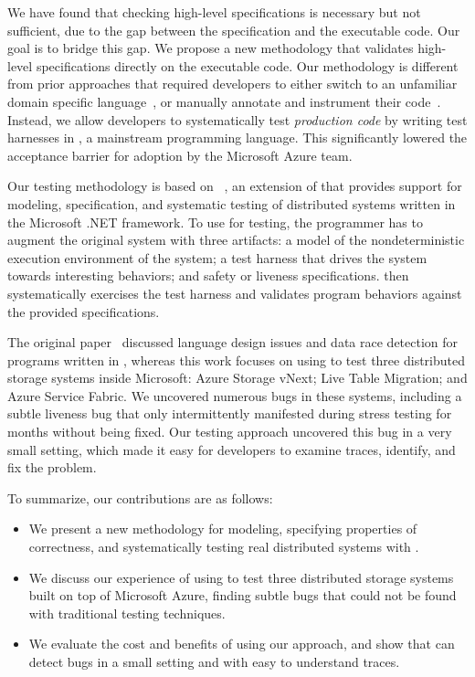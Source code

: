We have found that checking high-level specifications is necessary but not sufficient, due to the gap between the specification and the executable code. Our goal is to bridge this gap. We propose a new methodology that validates high-level specifications directly on the executable code. Our methodology is different from prior approaches that required developers to either switch to an unfamiliar domain specific language~\cite{killian2007life, desai2015building}, or manually annotate and instrument their code~\cite{simsa2011dbug}. Instead, we allow developers to systematically test \emph{production code} by writing test harnesses in \csharp, a mainstream programming language. This significantly lowered the acceptance barrier for adoption by the Microsoft Azure team.

Our testing methodology is based on \psharp~\cite{deligiannis2015psharp}, an extension of \csharp that provides support for modeling, specification, and systematic testing of distributed systems written in the Microsoft .NET framework. To use \psharp for testing, the programmer has to augment the original system with three artifacts: a model of the nondeterministic execution environment of the system; a test harness that drives the system towards interesting behaviors; and safety or liveness specifications. \psharp then systematically exercises the test harness and validates program behaviors against the provided specifications.

The original \psharp paper~\cite{deligiannis2015psharp} discussed language design issues and data race detection for programs written in \psharp, whereas this work focuses on using \psharp to test three distributed storage systems inside Microsoft: Azure Storage vNext; Live Table Migration; and Azure Service Fabric. We uncovered numerous bugs in these systems, including a subtle liveness bug that only intermittently manifested during stress testing for months without being fixed. Our testing approach uncovered this bug in a very small setting, which made it easy for developers to examine traces, identify, and fix the problem.

To summarize, our contributions are as follows:
\begin{itemize}
\item We present a new methodology for modeling, specifying properties of correctness, and systematically testing real distributed systems with \psharp.
\item We discuss our experience of using \psharp to test three distributed storage systems built on top of Microsoft Azure, finding subtle bugs that could not be found with traditional testing techniques.
\item We evaluate the cost and benefits of using our approach, and show that \psharp can detect bugs in a small setting and with easy to understand traces.
\end{itemize}
